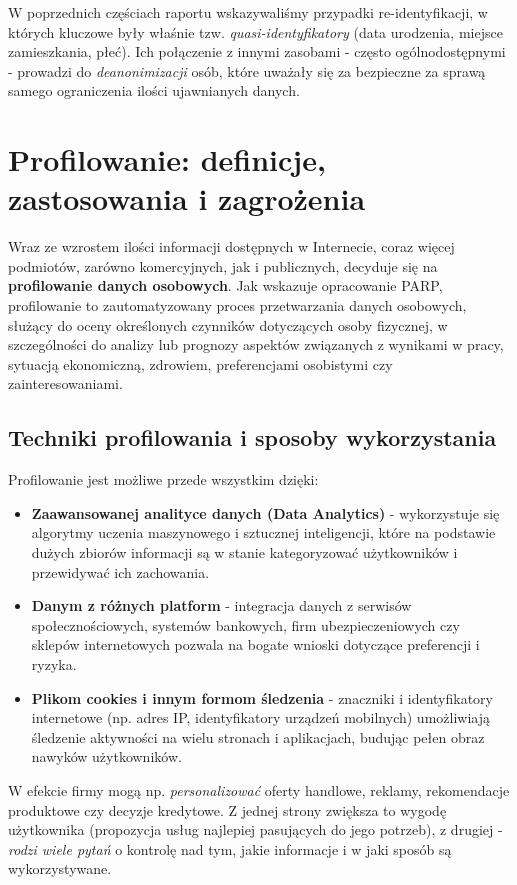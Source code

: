 W poprzednich częściach raportu wskazywaliśmy przypadki re-identyfikacji, w których kluczowe były właśnie tzw. \emph{quasi-identyfikatory} (data urodzenia, miejsce zamieszkania, płeć). Ich połączenie z innymi zasobami - często ogólnodostępnymi - prowadzi do \emph{deanonimizacji} osób, które uważały się za bezpieczne za sprawą samego ograniczenia ilości ujawnianych danych.

\vspace{12pt}
\section{Profilowanie: definicje, zastosowania i zagrożenia}

Wraz ze wzrostem ilości informacji dostępnych w Internecie, coraz więcej podmiotów, zarówno komercyjnych, jak i publicznych, decyduje się na \textbf{profilowanie danych osobowych}. Jak wskazuje opracowanie PARP\cite{POIR_PROFILOWANIE}, profilowanie to zautomatyzowany proces przetwarzania danych osobowych, służący do oceny określonych czynników dotyczących osoby fizycznej, w szczególności do analizy lub prognozy aspektów związanych z wynikami w pracy, sytuacją ekonomiczną, zdrowiem, preferencjami osobistymi czy zainteresowaniami.

\subsection{Techniki profilowania i sposoby wykorzystania}
Profilowanie jest możliwe przede wszystkim dzięki:
\begin{itemize}
    \item \textbf{Zaawansowanej analityce danych (Data Analytics)} - wykorzystuje się algorytmy uczenia maszynowego i sztucznej inteligencji, które na podstawie dużych zbiorów informacji są w stanie kategoryzować użytkowników i przewidywać ich zachowania.
    \item \textbf{Danym z różnych platform} - integracja danych z serwisów społecznościowych, systemów bankowych, firm ubezpieczeniowych czy sklepów internetowych pozwala na bogate wnioski dotyczące preferencji i ryzyka.
    \item \textbf{Plikom cookies i innym formom śledzenia} - znaczniki i identyfikatory internetowe (np. adres IP, identyfikatory urządzeń mobilnych) umożliwiają śledzenie aktywności na wielu stronach i aplikacjach, budując pełen obraz nawyków użytkowników.
\end{itemize}

W efekcie firmy mogą np. \emph{personalizować} oferty handlowe, reklamy, rekomendacje produktowe czy decyzje kredytowe. Z jednej strony zwiększa to wygodę użytkownika (propozycja usług najlepiej pasujących do jego potrzeb), z drugiej - \emph{rodzi wiele pytań} o kontrolę nad tym, jakie informacje i w jaki sposób są wykorzystywane.

